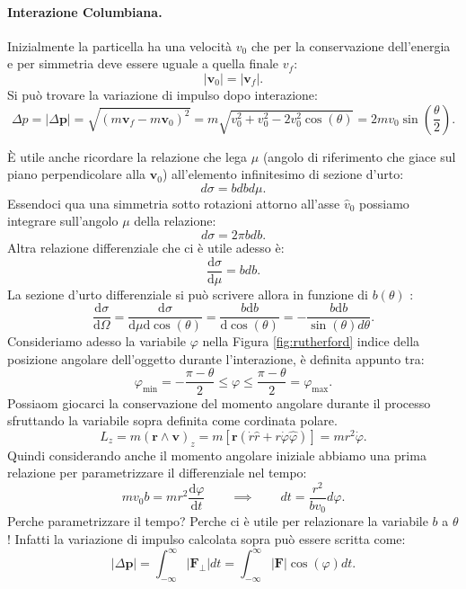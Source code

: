 \paragraph{Interazione Columbiana.}
Inizialmente la particella ha una velocità $v_0$ che per la conservazione dell'energia e per simmetria deve essere uguale a quella finale $v_f$:
 \[
\left| \boldsymbol{v}_0 \right|  = \left| \boldsymbol{v}_f \right| 
.\] 
Si può trovare la variazione di impulso dopo interazione:
\[
	\Delta p = \left| \Delta \boldsymbol{p} \right| = \sqrt{\left( m \boldsymbol{v}_f - m \boldsymbol{v}_0 \right)^2} = m \sqrt{v_0^2 + v_0^2 -2v_0^2 \cos\left( \theta \right)} = 2m v_0 \sin\left( \frac{\theta}{2} \right)   
.\]
 
È utile anche ricordare la relazione che lega $\mu$ (angolo di riferimento che giace sul piano perpendicolare alla $\boldsymbol{v}_0$) all'elemento infinitesimo di sezione d'urto:
\[
d \sigma = b db d\mu
.\] 
Essendoci qua una simmetria sotto rotazioni attorno all'asse $\hat{v}_0$ possiamo integrare sull'angolo $\mu$ della relazione:
\[
d\sigma = 2 \pi b db
.\] 
Altra relazione differenziale che ci è utile adesso è: 
\[
\frac{\mbox{d} \sigma}{\mbox{d} \mu} = b db
.\] 
La sezione d'urto differenziale si può scrivere allora in funzione di $b\left( \theta \right)$ :
\[
	\frac{\mbox{d} \sigma}{\mbox{d} \Omega} = \frac{\mbox{d} \sigma}{\mbox{d}\mu \mbox{d}\cos\left( \theta \right) } = \frac{ b \mbox{d}b}{\mbox{d}\cos\left( \theta \right)} = - \frac{b \text{d}b}{ \sin\left( \theta \right) d \theta }  
.\]
Consideriamo adesso la variabile $\varphi$ nella Figura \ref{fig:rutherford} indice della posizione angolare dell'oggetto durante l'interazione, è definita appunto tra:
\[
\varphi_{\text{min}} = -\frac{\pi - \theta}{2} \le \varphi \le \frac{\pi -\theta}{2} = \varphi_{\text{max}}
.\] 
Possiaom giocarci la conservazione del momento angolare durante il processo sfruttando la variabile sopra definita come cordinata polare.
\[
	L_z = m \left( \boldsymbol{r \wedge \boldsymbol{v}}\right)_z = m \left[ \boldsymbol{r} \left( \dot{r} \hat{r} + r \dot{\varphi} \hat{\varphi}\right)\right]=
	mr^2\dot{\varphi}
.\] 
Quindi considerando anche il momento angolare iniziale abbiamo una prima relazione per parametrizzare il differenziale nel tempo:
\[
m v_0 b = m r^2 \frac{\mbox{d} \varphi}{\mbox{d} t} \quad \quad \implies \quad \quad dt = \frac{r^2}{b v_0} d\varphi
.\] 
Perche parametrizzare il tempo? Perche ci è utile per relazionare la variabile $b$ a $\theta$! Infatti la variazione di impulso calcolata sopra può essere scritta come:
\[
\left| \Delta \boldsymbol{p} \right| = \int_{-\infty}^{\infty} \left| \boldsymbol{F}_{\perp}\right| dt = 
\int_{-\infty}^{\infty} \left| \boldsymbol{F}\right| \cos\left( \varphi \right)  dt 
.\]
